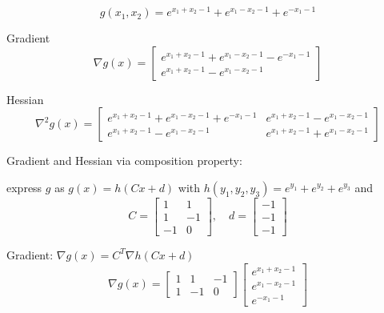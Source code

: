 \begin{example}
    \begin{equation} g\left(x_{1}, x_{2}\right)=e^{x_{1}+x_{2}-1}+e^{x_{1}-x_{2}-1}+e^{-x_{1}-1} \end{equation}

    Gradient
\begin{equation}
\nabla g(x)=\left[\begin{array}{c}
e^{x_{1}+x_{2}-1}+e^{x_{1}-x_{2}-1}-e^{-x_{1}-1} \\
e^{x_{1}+x_{2}-1}-e^{x_{1}-x_{2}-1}
\end{array}\right]
\end{equation}

Hessian
\begin{equation}
\nabla^{2} g(x)=\left[\begin{array}{cc}
e^{x_{1}+x_{2}-1}+e^{x_{1}-x_{2}-1}+e^{-x_{1}-1} & e^{x_{1}+x_{2}-1}-e^{x_{1}-x_{2}-1} \\
e^{x_{1}+x_{2}-1}-e^{x_{1}-x_{2}-1} & e^{x_{1}+x_{2}-1}+e^{x_{1}-x_{2}-1}
\end{array}\right]
\end{equation}

Gradient and Hessian via composition property:

express $ g $ as $ g(x)=h(C x+d) $ with $ h\left(y_{1}, y_{2}, y_{3}\right)=e^{y_{1}}+e^{y_{2}}+e^{y_{3}} $ and
\begin{equation}
C=\left[\begin{array}{rr}
1 & 1 \\
1 & -1 \\
-1 & 0
\end{array}\right], \quad d=\left[\begin{array}{l}
-1 \\
-1 \\
-1
\end{array}\right]
\end{equation}

Gradient: $ \nabla g(x)=C^{T} \nabla h(C x+d) $
\begin{equation}
\nabla g(x)=\left[\begin{array}{rrr}
1 & 1 & -1 \\
1 & -1 & 0
\end{array}\right]\left[\begin{array}{c}
e^{x_{1}+x_{2}-1} \\
e^{x_{1}-x_{2}-1} \\
e^{-x_{1}-1}
\end{array}\right]
\end{equation}


\end{example}
